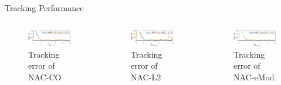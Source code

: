 \documentclass[8pt, aspectratio=169, handout]{beamer}
\begin{document}
\begin{frame}{\insertsubsectionhead}{Tracking Performance}

  \begin{columns}


      \begin{figure}
        \includegraphics[width=0.99\textwidth]{figures/ECC/fig5.eps}
        \caption{Tracking error of NAC-CO}
      \end{figure}
    

      \begin{figure}      
        \includegraphics[width=0.99\textwidth]{figures/ECC/fig6.eps}
        \caption{Tracking error of NAC-L2}
      \end{figure}
      

      \begin{figure}
        \includegraphics[width=0.99\textwidth]{figures/ECC/fig7.eps}
        \caption{Tracking error of NAC-eMod}
      \end{figure}


\end{columns}
\end{frame}
\end{document}
